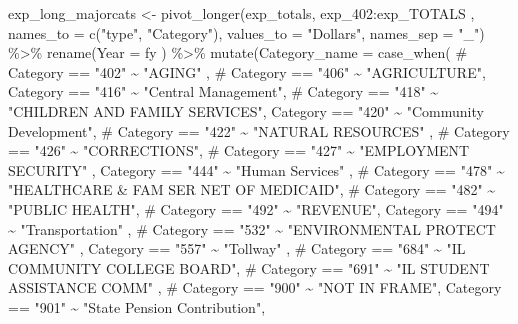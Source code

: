 \documentclass[
  letterpaper,
  DIV=11,
  numbers=noendperiod]{scrreport}
\newenvironment{Shaded}{\begin{snugshade}}{\end{snugshade}}
\newcommand{\AttributeTok}[1]{\textcolor[rgb]{0.40,0.45,0.13}{#1}}
\newcommand{\CommentTok}[1]{\textcolor[rgb]{0.37,0.37,0.37}{#1}}
\newcommand{\FunctionTok}[1]{\textcolor[rgb]{0.28,0.35,0.67}{#1}}
\newcommand{\NormalTok}[1]{\textcolor[rgb]{0.00,0.23,0.31}{#1}}
\newcommand{\OtherTok}[1]{\textcolor[rgb]{0.00,0.23,0.31}{#1}}
\newcommand{\SpecialCharTok}[1]{\textcolor[rgb]{0.37,0.37,0.37}{#1}}
\newcommand{\StringTok}[1]{\textcolor[rgb]{0.13,0.47,0.30}{#1}}
\begin{document}
\begin{Shaded}
\begin{Highlighting}[]
\NormalTok{exp\_long\_majorcats }\OtherTok{\textless{}{-}} \FunctionTok{pivot\_longer}\NormalTok{(exp\_totals, exp\_402}\SpecialCharTok{:}\NormalTok{exp\_TOTALS , }\AttributeTok{names\_to =} \FunctionTok{c}\NormalTok{(}\StringTok{"type"}\NormalTok{, }\StringTok{"Category"}\NormalTok{), }\AttributeTok{values\_to =} \StringTok{"Dollars"}\NormalTok{, }\AttributeTok{names\_sep =} \StringTok{"\_"}\NormalTok{) }\SpecialCharTok{\%\textgreater{}\%} 
  \FunctionTok{rename}\NormalTok{(}\AttributeTok{Year =}\NormalTok{ fy ) }\SpecialCharTok{\%\textgreater{}\%} 
  \FunctionTok{mutate}\NormalTok{(}\AttributeTok{Category\_name =} 
           \FunctionTok{case\_when}\NormalTok{(}
            \CommentTok{\# Category == "402" \textasciitilde{} "AGING" ,}
           \CommentTok{\#  Category == "406" \textasciitilde{} "AGRICULTURE", }
\NormalTok{             Category }\SpecialCharTok{==} \StringTok{"416"} \SpecialCharTok{\textasciitilde{}} \StringTok{"Central Management"}\NormalTok{,}
            \CommentTok{\# Category == "418" \textasciitilde{} "CHILDREN AND FAMILY SERVICES", }
\NormalTok{             Category }\SpecialCharTok{==} \StringTok{"420"} \SpecialCharTok{\textasciitilde{}} \StringTok{"Community Development"}\NormalTok{,}
           \CommentTok{\#  Category == "422" \textasciitilde{} "NATURAL RESOURCES" ,}
            \CommentTok{\# Category == "426" \textasciitilde{} "CORRECTIONS",}
           \CommentTok{\#  Category == "427" \textasciitilde{} "EMPLOYMENT SECURITY" ,}
\NormalTok{             Category }\SpecialCharTok{==} \StringTok{"444"} \SpecialCharTok{\textasciitilde{}} \StringTok{"Human Services"}\NormalTok{ ,}
           \CommentTok{\#  Category == "478" \textasciitilde{} "HEALTHCARE \& FAM SER NET OF MEDICAID", }
           \CommentTok{\#  Category == "482" \textasciitilde{} "PUBLIC HEALTH", }
           \CommentTok{\#  Category == "492" \textasciitilde{} "REVENUE", }
\NormalTok{             Category }\SpecialCharTok{==} \StringTok{"494"} \SpecialCharTok{\textasciitilde{}} \StringTok{"Transportation"}\NormalTok{ ,}
           \CommentTok{\#  Category == "532" \textasciitilde{} "ENVIRONMENTAL PROTECT AGENCY" ,}
\NormalTok{             Category }\SpecialCharTok{==} \StringTok{"557"} \SpecialCharTok{\textasciitilde{}} \StringTok{"Tollway"}\NormalTok{ ,}
           \CommentTok{\#  Category == "684" \textasciitilde{} "IL COMMUNITY COLLEGE BOARD", }
            \CommentTok{\# Category == "691" \textasciitilde{} "IL STUDENT ASSISTANCE COMM" ,}
           \CommentTok{\#  Category == "900" \textasciitilde{} "NOT IN FRAME",}
\NormalTok{             Category }\SpecialCharTok{==} \StringTok{"901"} \SpecialCharTok{\textasciitilde{}} \StringTok{"State Pension Contribution"}\NormalTok{,}

\end{Highlighting}
\end{Shaded}
\end{document}

